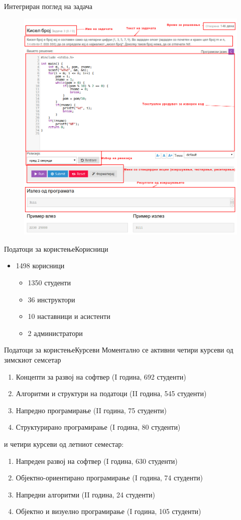 \begin{frame}{Интегриран поглед на задача}
    \begin{figure}
    \centering
        \includegraphics[width=.6\textwidth]{images/integrated_code_view}
        \label{fig:architecture}
    \end{figure}
  \end{frame}


\begin{frame}{Податоци за користење}{Корисници}
\begin{itemize}
  \item 1498 корисници
    \begin{itemize}
    \item 1350 студенти
    \item 36 инструктори
    \item 10 наставници и асистенти
    \item 2 администратори
    \end{itemize}
\end{itemize}
\end{frame}

\begin{frame}{Податоци за користење}{Курсеви}
Моментално се активни четири курсеви од зимскиот семсетар
\begin{enumerate}
  \item Концепти за развој на софтвер (I година, 692 студенти)
  \item Алгоритми и структури на податоци (II година, 545 студенти)
  \item Напредно програмирање (II година, 75 студенти)
  \item Структурирано програмирање (I година, 80 студенти)
\end{enumerate}
и четири курсеви од летниот семестар:
\begin{enumerate}
  \item Напреден развој на софтвер (I година, 630 студенти)
  \item Објектно-ориентирано програмирање (I година, 74 студенти)
  \item Напредни алгоритми (II година, 24 студенти)
  \item Објектно и визуелно програмирање (I година, 105 студенти)
\end{enumerate}
\end{frame}

